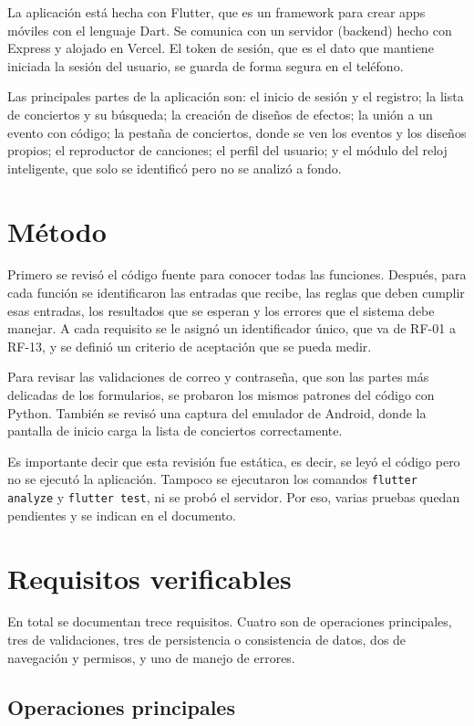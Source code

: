 \documentclass[11pt,a4paper]{article}
\begin{document}
La aplicación está hecha con Flutter, que es un framework para crear apps móviles con el lenguaje Dart. Se comunica con un servidor (backend) hecho con Express y alojado en Vercel. El token de sesión, que es el dato que mantiene iniciada la sesión del usuario, se guarda de forma segura en el teléfono.

Las principales partes de la aplicación son: el inicio de sesión y el registro; la lista de conciertos y su búsqueda; la creación de diseños de efectos; la unión a un evento con código; la pestaña de conciertos, donde se ven los eventos y los diseños propios; el reproductor de canciones; el perfil del usuario; y el módulo del reloj inteligente, que solo se identificó pero no se analizó a fondo.

\section*{Método}

Primero se revisó el código fuente para conocer todas las funciones. Después, para cada función se identificaron las entradas que recibe, las reglas que deben cumplir esas entradas, los resultados que se esperan y los errores que el sistema debe manejar. A cada requisito se le asignó un identificador único, que va de RF-01 a RF-13, y se definió un criterio de aceptación que se pueda medir.

Para revisar las validaciones de correo y contraseña, que son las partes más delicadas de los formularios, se probaron los mismos patrones del código con Python. También se revisó una captura del emulador de Android, donde la pantalla de inicio carga la lista de conciertos correctamente.

Es importante decir que esta revisión fue estática, es decir, se leyó el código pero no se ejecutó la aplicación. Tampoco se ejecutaron los comandos \texttt{flutter analyze} y \texttt{flutter test}, ni se probó el servidor. Por eso, varias pruebas quedan pendientes y se indican en el documento.

\section*{Requisitos verificables}

En total se documentan trece requisitos. Cuatro son de operaciones principales, tres de validaciones, tres de persistencia o consistencia de datos, dos de navegación y permisos, y uno de manejo de errores.

\subsection*{Operaciones principales}
\end{document}
